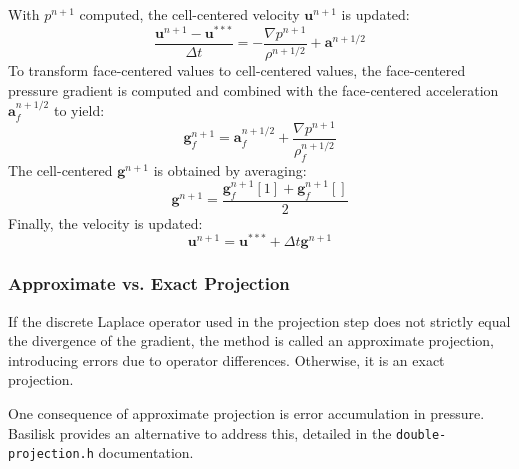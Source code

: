 \documentclass[a4paper]{article}
\begin{document}
With $p^{n+1}$ computed, the cell-centered velocity $\mathbf{u}^{n+1}$ is updated:  
\begin{equation}
    \frac{\mathbf{u}^{n+1} - \mathbf{u}^{***}}{\Delta t} = -\frac{\nabla
    p^{n+1}}{\rho^{n+1/2}} + \mathbf{a}^{n+1/2}
\end{equation}  
To transform face-centered values to cell-centered values, the face-centered pressure gradient is computed and combined with the face-centered acceleration $\mathbf{a}_f^{n+1/2}$ to yield:  
\begin{equation}
    \mathbf{g}_f^{n+1} = \mathbf{a}_f^{n+1/2} + \frac{\nabla p^{n+1}}{\rho_f^{n+1/2}}
\end{equation}  
The cell-centered $\mathbf{g}^{n+1}$ is obtained by averaging:  
\begin{equation}
    \mathbf{g}^{n+1} = \frac{\mathbf{g}_f^{n+1}[1] + \mathbf{g}_f^{n+1}[]}{2}
\end{equation}  
Finally, the velocity is updated:  
\begin{equation}
    \mathbf{u}^{n+1} = \mathbf{u}^{***} + \Delta t \mathbf{g}^{n+1}
\end{equation}  

\subsubsection{Approximate vs. Exact Projection}  

If the discrete Laplace operator used in the projection step does not strictly equal the divergence of the gradient, the method is called an approximate projection, introducing errors due to operator differences. Otherwise, it is an exact projection\cite{2000_Almgren}.  

One consequence of approximate projection is error accumulation in pressure. Basilisk provides an alternative to address this, detailed in the \texttt{double-projection.h} documentation.  

\printbibliography
\end{document}
